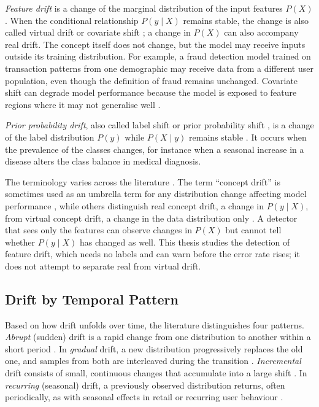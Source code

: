 \emph{Feature drift} is a change of the marginal distribution of the input features $P(X)$. When the conditional relationship $P(y \mid X)$ remains stable, the change is also called virtual drift \citep{Tsymbal2004, Gama2014} or covariate shift \citep{Shimodaira2000}; a change in $P(X)$ can also accompany real drift. The concept itself does not change, but the model may receive inputs outside its training distribution. For example, a fraud detection model trained on transaction patterns from one demographic may receive data from a different user population, even though the definition of fraud remains unchanged. Covariate shift can degrade model performance because the model is exposed to feature regions where it may not generalise well \citep{Shimodaira2000}.

\emph{Prior probability drift}, also called label shift or prior probability shift \citep{Lu2018}, is a change of the label distribution $P(y)$ while $P(X \mid y)$ remains stable \citep{Zliobaite2010}. It occurs when the prevalence of the classes changes, for instance when a seasonal increase in a disease alters the class balance in medical diagnosis.

The terminology varies across the literature \citep{Lu2018}. The term ``concept drift'' is sometimes used as an umbrella term for any distribution change affecting model performance \citep{Gama2014}, while others distinguish real concept drift, a change in $P(y \mid X)$, from virtual concept drift, a change in the data distribution only \citep{Tsymbal2004}. A detector that sees only the features can observe changes in $P(X)$ but cannot tell whether $P(y \mid X)$ has changed as well. This thesis studies the detection of feature drift, which needs no labels and can warn before the error rate rises; it does not attempt to separate real from virtual drift.

\subsection{Drift by Temporal Pattern}
Based on how drift unfolds over time, the literature \citep{Lu2018, Gama2014, Zliobaite2010, Webb2016} distinguishes four patterns. \emph{Abrupt} (sudden) drift is a rapid change from one distribution to another within a short period \citep{Gama2014}. In \emph{gradual} drift, a new distribution progressively replaces the old one, and samples from both are interleaved during the transition \citep{Lu2018}. \emph{Incremental} drift consists of small, continuous changes that accumulate into a large shift \citep{Zliobaite2010}. In \emph{recurring} (seasonal) drift, a previously observed distribution returns, often periodically, as with seasonal effects in retail or recurring user behaviour \citep{Lu2018, Gama2014}.

